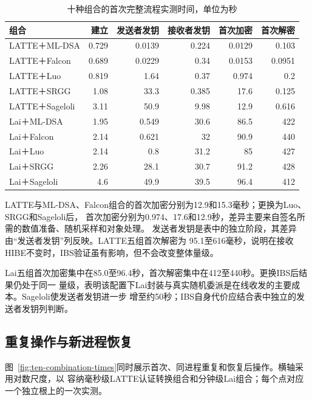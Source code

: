 \begin{table}[H]
\centering\small
\caption{十种组合的首次完整流程实测时间，单位为秒}
\label{tab:ten-first-times}
\setlength{\tabcolsep}{4pt}
\begin{tabular}{@{}lrrrrr@{}}
\toprule
\rowcolor{black!8} 组合 & 建立 & 发送者发钥 & 接收者发钥 & 首次加密 & 首次解密 \\
\midrule
LATTE＋ML-DSA & 0.729 & 0.0139 & 0.224 & 0.0129 & 0.103 \\
LATTE＋Falcon & 0.689 & 0.0229 & 0.34 & 0.0153 & 0.0951 \\
LATTE＋Luo & 0.819 & 1.64 & 0.37 & 0.974 & 0.2 \\
LATTE＋SRGG & 1.08 & 33.3 & 0.385 & 17.6 & 0.125 \\
LATTE＋Sageloli & 3.11 & 50.9 & 9.98 & 12.9 & 0.616 \\
Lai＋ML-DSA & 1.95 & 0.549 & 30.6 & 86.5 & 422 \\
Lai＋Falcon & 2.14 & 0.621 & 32 & 90.9 & 440 \\
Lai＋Luo & 2.14 & 0.8 & 31.2 & 85 & 427 \\
Lai＋SRGG & 2.26 & 28.1 & 30.7 & 91.2 & 428 \\
Lai＋Sageloli & 4.6 & 49.9 & 39.5 & 96.4 & 412 \\
\bottomrule
\end{tabular}
\end{table}

LATTE与ML-DSA、Falcon组合的首次加密分别为12.9和15.3毫秒；更换为Luo、SRGG和Sageloli后，
首次加密分别为0.974、17.6和12.9秒，差异主要来自签名所需的数值准备、随机采样和对象处理。
发送者发钥是表中的独立阶段，其差异由“发送者发钥”列反映。LATTE五组首次解密为
95.1至616毫秒，说明在接收HIBE不变时，IBS验证虽有影响，但不会改变整体量级。

Lai五组首次加密集中在85.0至96.4秒，首次解密集中在412至440秒。更换IBS后结果仍处于同一
量级，表明该配置下Lai封装与真实随机委派是在线收发的主要成本。Sageloli使发送者发钥进一步
增至约50秒；IBS自身代价应结合表中独立的发送者发钥列判断。

\subsection{重复操作与新进程恢复}

图~\ref{fig:ten-combination-times}同时展示首次、同进程重复和恢复后操作。横轴采用对数尺度，以
容纳毫秒级LATTE认证转换组合和分钟级Lai组合；每个点对应一个独立根上的一次实测。

